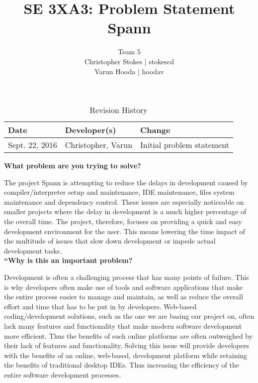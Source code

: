 \documentclass{article}
\title{SE 3XA3: Problem Statement\\Spann}
\author{Team 5
		\\ Christopher Stokes | stokescd
		\\ Varun Hooda | hoodav
}
\date{}
\begin{document}
\begin{table}[hp]
\caption{Revision History} \label{TblRevisionHistory}
\begin{tabularx}{\textwidth}{llX}
\toprule
\textbf{Date} & \textbf{Developer(s)} & \textbf{Change}\\
\midrule
    Sept. 22, 2016 & Christopher, Varun & Initial problem statement\\
\bottomrule
\end{tabularx}
\end{table}

\newpage

\maketitle

\large
\textbf{What problem are you trying to solve?}\\
\normalsize

The project Spann is attempting to reduce the delays in development
caused by compiler/interpreter setup and maintenance,  IDE maintenance,
files system maintenance and dependency control. These issues are especially
noticeable on smaller projects where the delay in development is a much higher
percentage of the overall time. The project, therefore, focuses on providing a
quick and easy development environment for the user. This means lowering the
time impact of the multitude of issues that slow down development or impede
actual development tasks.\\

\large
\textbf{“Why is this an important problem?}\\
\normalsize

Development is often a challenging process that has many points of failure.
This is why developers often make use of tools and software applications that
make the entire process easier to manage and maintain, as well as reduce the
overall effort and time that has to be put in by developers. Web-based
coding/development solutions, such as the one we are basing our project on,
often lack many features and functionality that make modern software
development more efficient. Thus the benefits of such online platforms are
often outweighed by their lack of features and functionality. Solving this
issue will provide developers with the benefits of an online, web-based,
development platform while retaining the benefits of traditional desktop IDEs.
Thus increasing the efficiency of the entire software development processes.\\
\end{document}
